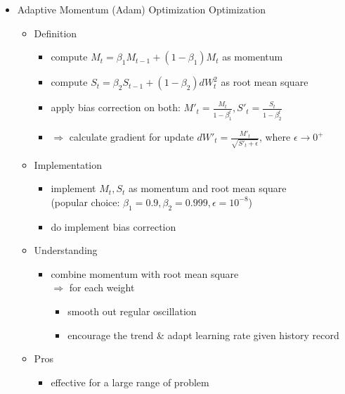 \begin{itemize}
\item Adaptive Momentum (Adam) Optimization Optimization
	\begin{itemize}
	\item Definition
		\begin{itemize}
		\item compute $M_t = \beta_1 M_{t-1} + (1-\beta_1) M_t$ as momentum
		\item compute $S_t = \beta_2 S_{t-1} + (1-\beta_2) dW_t^2$ as root mean square
		\item apply bias correction on both: $M'_t=\frac {M_t}{1-\beta_1^t}, S'_t=\frac {S_t}{1-\beta_2^t}$
		\item $\Rightarrow$ calculate gradient for update $dW'_t=\frac {M'_t} {\sqrt{S'_t+\epsilon}}$, where $\epsilon\rightarrow 0^+$
		\end{itemize}
	\item Implementation
		\begin{itemize}
		\item implement $M_t,S_t$ as momentum and root mean square \\
		(popular choice: $\beta_1=0.9, \beta_2=0.999, \epsilon=10^{-8}$)
		\item do implement bias correction
		\end{itemize}
	\item Understanding
		\begin{itemize}
		\item combine momentum with root mean square \\
		$\Rightarrow$ for each weight
			\begin{itemize}
			\item smooth out regular oscillation
			\item encourage the trend \& adapt learning rate given history record
			\end{itemize}
		\end{itemize}
	\item Pros
		\begin{itemize}
		\item effective for a large range of problem
		\end{itemize}
	\end{itemize}


\end{itemize}

